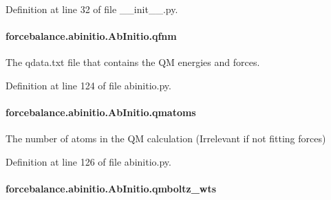Definition at line 32 of file \-\_\-\-\_\-init\-\_\-\-\_\-.\-py.

\hypertarget{classforcebalance_1_1abinitio_1_1AbInitio_ac93db408472034937e79572bf872886c}{
\paragraph[{qfnm}]{\setlength{\rightskip}{0pt plus 5cm}forcebalance.\-abinitio.\-Ab\-Initio.\-qfnm\hspace{0.3cm}{\ttfamily [inherited]}}}\label{classforcebalance_1_1abinitio_1_1AbInitio_ac93db408472034937e79572bf872886c}


The qdata.\-txt file that contains the Q\-M energies and forces. 



Definition at line 124 of file abinitio.\-py.

\hypertarget{classforcebalance_1_1abinitio_1_1AbInitio_af0760b8d33ce9dd044ccbe68fba7a1be}{
\paragraph[{qmatoms}]{\setlength{\rightskip}{0pt plus 5cm}forcebalance.\-abinitio.\-Ab\-Initio.\-qmatoms\hspace{0.3cm}{\ttfamily [inherited]}}}\label{classforcebalance_1_1abinitio_1_1AbInitio_af0760b8d33ce9dd044ccbe68fba7a1be}


The number of atoms in the Q\-M calculation (Irrelevant if not fitting forces) 



Definition at line 126 of file abinitio.\-py.

\hypertarget{classforcebalance_1_1abinitio_1_1AbInitio_a06ec6b12d81791ca94f599f41e56335a}{
\paragraph[{qmboltz\-\_\-wts}]{\setlength{\rightskip}{0pt plus 5cm}forcebalance.\-abinitio.\-Ab\-Initio.\-qmboltz\-\_\-wts\hspace{0.3cm}{\ttfamily [inherited]}}}\label{classforcebalance_1_1abinitio_1_1AbInitio_a06ec6b12d81791ca94f599f41e56335a}


